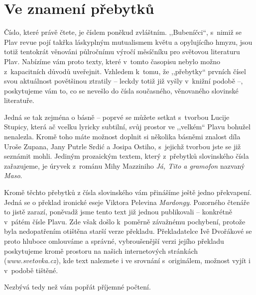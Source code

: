 \section{Ve znamení přebytků}

\noindent
Číslo, které právě čtete, je číslem poněkud zvláštním. ,,Bubeníčci``, s nimiž se Plav revue pojí takřka láskyplným mutualismem květu a opylujícího hmyzu, jsou totiž tentokrát věnováni půlročnímu výročí měsíčníku pro světovou literaturu Plav. Nabízíme vám proto texty, které v tomto časopisu nebylo možno z kapacitních důvodů uveřejnit. Vzhledem k tomu, že ,,přebytky`` prvních čísel svou aktuálnost povětšinou ztratily -- leckdy totiž již vyšly v knižní podobě --, poskytujeme vám to, co se nevešlo do čísla současného, věnovaného slovinské literatuře. 

Jedná se tak zejména o básně – poprvé se můžete setkat s tvorbou Lucije Stupicy, která ač vcelku lyricky subtilní, svůj prostor ve ,,velkém`` Plavu bohužel nenalezla. Kromě toho máte možnost doplnit si několika básněmi znalost díla Uroše Zupana, Jany Putrle Srdić a Josipa Ostiho, s jejichž tvorbou jste se již seznámit mohli. Jediným prozaickým textem, který z přebytků slovinského čísla zařazujeme, je úryvek z románu Mihy Mazziniho \textit{Já, Tito a gramofon} nazvaný \textit{Maso}. 

Kromě těchto přebytků z čísla slovinského vám přinášíme ještě jedno překvapení. Jedná se o překlad ironické eseje Viktora Pelevina \textit{Mardongy}. Pozorného čtenáře to jistě zarazí, poněvadž jsme tento text již jednou publikovali – konkrétně v pátém čísle Plavu. Zde však došlo k poměrně závažnému pochybení, protože byla nedopatřením otištěna starší verze překladu. Překladatelce Ivě Dvořákové se proto hluboce omlouváme a správné, vybroušenější verzi jejího překladu poskytujeme kromě prostoru na našich internetových stránkách (\textit{www.svetovka.cz}), kde text naleznete i ve srovnání s originálem, možnost vyjít i v podobě tištěné.

Nezbývá tedy než vám popřát příjemné počtení. 

